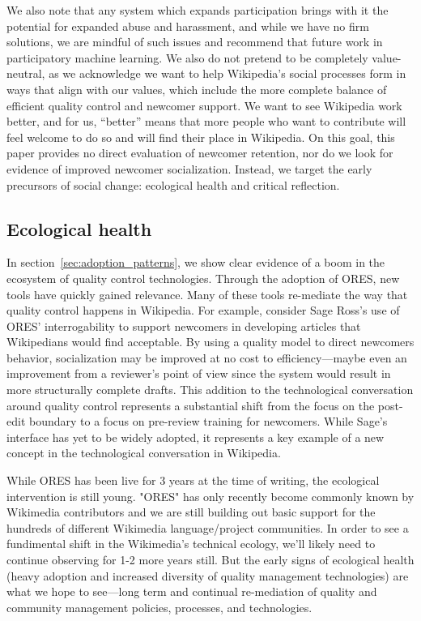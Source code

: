 We also note that any system which expands participation brings with it the potential for expanded abuse and harassment, and while we have no firm solutions, we are mindful of such issues and recommend that future work in participatory machine learning. We also do not pretend to be completely value-neutral, as we acknowledge we want to help Wikipedia's social processes form in ways that align with our values, which include the more complete balance of efficient quality control and newcomer support. We want to see Wikipedia work better, and for us, ``better'' means that more people who want to contribute will feel welcome to do so and will find their place in Wikipedia. On this goal, this paper provides no direct evaluation of newcomer retention, nor do we look for evidence of improved newcomer socialization. Instead, we target the early precursors of social change: ecological health and critical reflection.

\subsection{Ecological health}
In section~\ref{sec:adoption_patterns}, we show clear evidence of a boom in the ecosystem of quality control technologies.  Through the adoption of ORES, new tools have quickly gained relevance.  Many of these tools re-mediate the way that quality control happens in Wikipedia.  For example, consider Sage Ross's use of ORES' interrogability to support newcomers in developing articles that Wikipedians would find acceptable.  By using a quality model to direct newcomers behavior, socialization may be improved at no cost to efficiency---maybe even an improvement from a reviewer's point of view since the system would result in more structurally complete drafts.  This addition to the technological conversation around quality control represents a substantial shift from the focus on the post-edit boundary\cite{geiger2012defense} to a focus on pre-review training for newcomers.  While Sage's interface has yet to be widely adopted, it represents a key example of a new concept in the technological conversation in Wikipedia.

While ORES has been live for 3 years at the time of writing, the ecological intervention is still young.  "ORES" has only recently become commonly known by Wikimedia contributors and we are still building out basic support for the hundreds of different Wikimedia language/project communities.  In order to see a fundimental shift in the Wikimedia's technical ecology, we'll likely need to continue observing for 1-2 more years still.  But the early signs of ecological health (heavy adoption and increased diversity of quality management technologies) are what we hope to see---long term and continual re-mediation of quality and community management policies, processes, and technologies.

